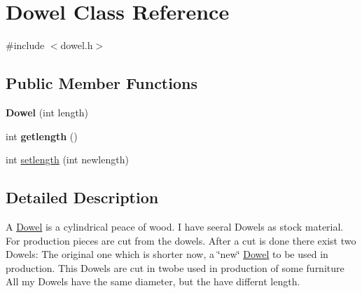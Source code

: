 \hypertarget{classDowel}{\section{Dowel Class Reference}
\label{classDowel}
}


{\ttfamily \#include $<$dowel.\-h$>$}

\subsection*{Public Member Functions}
\begin{DoxyCompactItemize}
\item 
\hypertarget{classDowel_a964757578119adbd7a06e226ca7eab45}{{\bfseries Dowel} (int length)}\label{classDowel_a964757578119adbd7a06e226ca7eab45}

\item 
\hypertarget{classDowel_a9136bf1349d168f6105ecba78dc2ce39}{int {\bfseries getlength} ()}\label{classDowel_a9136bf1349d168f6105ecba78dc2ce39}

\item 
int \hyperlink{classDowel_a80188d0af7600515d281155083c9d801}{setlength} (int newlength)
\end{DoxyCompactItemize}


\subsection{Detailed Description}
A \hyperlink{classDowel}{Dowel} is a cylindrical peace of wood. I have seeral Dowels as stock material. For production pieces are cut from the dowels. After a cut is done there exist two Dowels\-: The original one which is shorter now, a \char`\"{}new\char`\"{} \hyperlink{classDowel}{Dowel} to be used in production. This Dowels are cut in twobe used in production of some furniture All my Dowels have the same diameter, but the have differnt length. 

